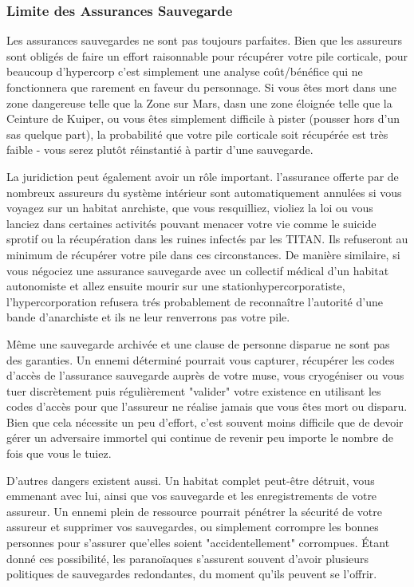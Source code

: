 \subsubsection{Limite des Assurances Sauvegarde} 

Les assurances sauvegardes ne sont pas toujours parfaites. Bien que les assureurs sont obligés de faire un effort raisonnable pour récupérer votre pile corticale, pour beaucoup d'hypercorp c'est simplement une analyse coût/bénéfice qui ne fonctionnera que rarement en faveur du personnage. Si vous êtes mort dans une zone dangereuse telle que la Zone sur Mars, dasn une zone éloignée telle que la Ceinture de Kuiper, ou vous êtes simplement difficile à pister (pousser hors d'un sas quelque part), la probabilité que votre pile corticale soit récupérée est très faible - vous serez plutôt réinstantié à partir d'une sauvegarde. 

La juridiction peut également avoir un rôle important. l'assurance offerte par de nombreux assureurs du système intérieur sont automatiquement annulées si vous voyagez sur un habitat anrchiste, que vous resquilliez, violiez la loi ou vous lanciez dans certaines activités pouvant menacer votre vie comme le suicide sprotif ou la récupération dans les ruines infectés par les TITAN. Ils refuseront au minimum de récupérer votre pile dans ces circonstances. De manière similaire, si vous négociez une assurance sauvegarde avec un collectif médical d'un habitat autonomiste et allez ensuite mourir sur une stationhypercorporatiste, l'hypercorporation refusera trés probablement de reconnaître l'autorité d'une bande d'anarchiste et ils ne leur renverrons pas votre pile. 

Même une sauvegarde archivée et une clause de personne disparue ne sont pas des garanties. Un ennemi déterminé pourrait vous capturer, récupérer les codes d'accès de l'assurance sauvegarde auprès de votre muse, vous cryogéniser ou vous tuer discrètement puis régulièrement "valider" votre existence en utilisant les codes d'accès pour que l'assureur ne réalise jamais que vous êtes mort ou disparu. Bien que cela nécessite un peu d'effort, c'est souvent moins difficile que de devoir gérer un adversaire immortel qui continue de revenir peu importe le nombre de fois que vous le tuiez. 

D'autres dangers existent aussi. Un habitat complet peut-être détruit, vous emmenant avec lui, ainsi que vos sauvegarde et les enregistrements de votre assureur. Un ennemi plein de ressource pourrait pénétrer la sécurité de votre assureur et supprimer vos sauvegardes, ou simplement corrompre les bonnes personnes pour s'assurer que'elles soient "accidentellement" corrompues. Étant donné ces possibilité, les paranoïaques s'assurent souvent d'avoir plusieurs politiques de sauvegardes redondantes, du moment qu'ils peuvent se l'offrir. 

